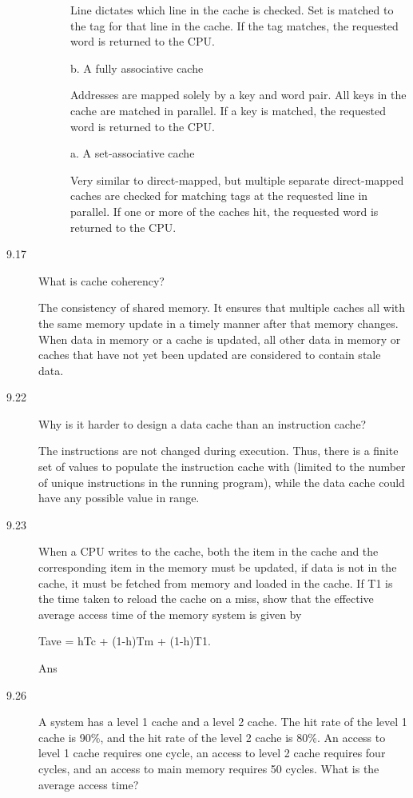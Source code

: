 \documentclass[letterpaper,10pt,titlepage]{article}
\begin{document}
\begin{description}
\begin{description}
        Line dictates which line in the cache is checked. Set is matched to the tag for that line in the cache. If the tag matches, the requested word is returned to the CPU.
        \item[] b. A fully associative cache
        
        Addresses are mapped solely by a key and word pair. All keys in the cache are matched in parallel. If a key is matched, the requested word is returned to the CPU.
        \item[] a. A set-associative cache
        
        Very similar to direct-mapped, but multiple separate direct-mapped caches are checked for matching tags at the requested line in parallel. If one or more of the caches hit, the requested word is returned to the CPU.
    \end{description}
    \item[9.17] What is cache coherency?
    
    The consistency of shared memory. It ensures that multiple caches all with the same memory update in a timely manner after that memory changes. When data in memory or a cache is updated, all other data in memory or caches that have not yet been updated are considered to contain stale data.
    \item[9.22] Why is it harder to design a data cache than an instruction cache?

    The instructions are not changed during execution. Thus, there is a finite set of values to populate the instruction cache with (limited to the number of unique instructions in the running program), while the data cache could have any possible value in range.
    \item[9.23] When a CPU writes to the cache, both the item in the cache and the corresponding item in the memory must be updated, if data is not in the cache, it must be fetched from memory and loaded in the cache. If T1 is the time taken to reload the cache on a miss, show that the effective average access time of the memory system is given by
	
    Tave = hTc + (1-h)Tm + (1-h)T1.
    
    Ans
    \item[9.26] A system has a level 1 cache and a level 2 cache. The hit rate of the level 1 cache is 90\%, and the hit rate of the level 2 cache is 80\%. An access to level 1 cache requires one cycle, an access to level 2 cache requires four cycles, and an access to main memory requires 50 cycles. What is the average access time?
    

\end{description}
\end{document}
